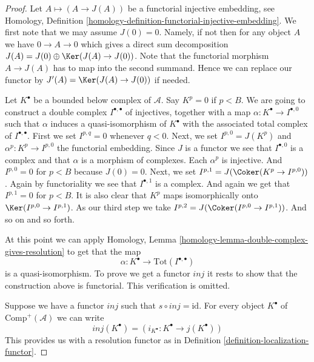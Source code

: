 \begin{proof}
Let $A \mapsto (A \to J(A))$ be a functorial injective embedding, see
Homology, Definition \ref{homology-definition-functorial-injective-embedding}.
We first note that we may assume $J(0) = 0$. Namely, if not then
for any object $A$ we have $0 \to A \to 0$ which gives
a direct sum decomposition $J(A) = J(0) \oplus \Ker(J(A) \to J(0))$.
Note that the functorial morphism $A \to J(A)$ has to map
into the second summand. Hence we can replace our functor
by $J'(A) = \Ker(J(A) \to J(0))$ if needed.

\medskip\noindent
Let $K^\bullet$ be a bounded below complex of $\mathcal{A}$.
Say $K^p = 0$ if $p < B$.
We are going to construct a double complex $I^{\bullet, \bullet}$
of injectives, together with a map $\alpha : K^\bullet \to I^{\bullet, 0}$
such that $\alpha$ induces a quasi-isomorphism of $K^\bullet$
with the associated total complex of $I^{\bullet, \bullet}$.
First we set $I^{p, q} = 0$ whenever $q < 0$.
Next, we set $I^{p, 0} = J(K^p)$ and $\alpha^p : K^p \to I^{p, 0}$
the functorial embedding. Since $J$ is a functor we see that
$I^{\bullet, 0}$ is a complex and that $\alpha$ is a
morphism of complexes. Each $\alpha^p$ is injective. And
$I^{p, 0} = 0$ for $p < B$ because $J(0) = 0$. Next, we set
$I^{p, 1} = J(\Coker(K^p \to I^{p, 0}))$. Again by functoriality
we see that $I^{\bullet, 1}$ is a complex. And again we get
that $I^{p, 1} = 0$ for $p < B$. It is also clear that
$K^p$ maps isomorphically onto $\Ker(I^{p, 0} \to I^{p, 1})$.
As our third step we take $I^{p, 2} = J(\Coker(I^{p, 0} \to I^{p, 1}))$.
And so on and so forth.

\medskip\noindent
At this point we can apply
Homology, Lemma \ref{homology-lemma-double-complex-gives-resolution}
to get that the map
$$
\alpha : K^\bullet \longrightarrow \text{Tot}(I^{\bullet, \bullet})
$$
is a quasi-isomorphism. To prove we get a functor $inj$ it
rests to show that the construction above
is functorial. This verification is omitted.

\medskip\noindent
Suppose we have a functor $inj$ such that $s \circ inj = \text{id}$.
For every object $K^\bullet$ of $\text{Comp}^{+}(\mathcal{A})$
we can write
$$
inj(K^\bullet) = (i_{K^\bullet} : K^\bullet \to j(K^\bullet))
$$
This provides us with a resolution functor as in
Definition \ref{definition-localization-functor}.
\end{proof}

